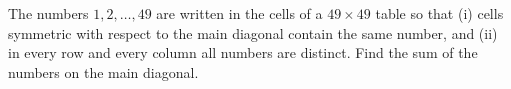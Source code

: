 The numbers $1,2,\dots,49$ are written in the cells of a $49\times49$ table so that (i) cells symmetric with respect to the main diagonal contain the same number, and (ii) in every row and every column all numbers are distinct. Find the sum of the numbers on the main diagonal.

